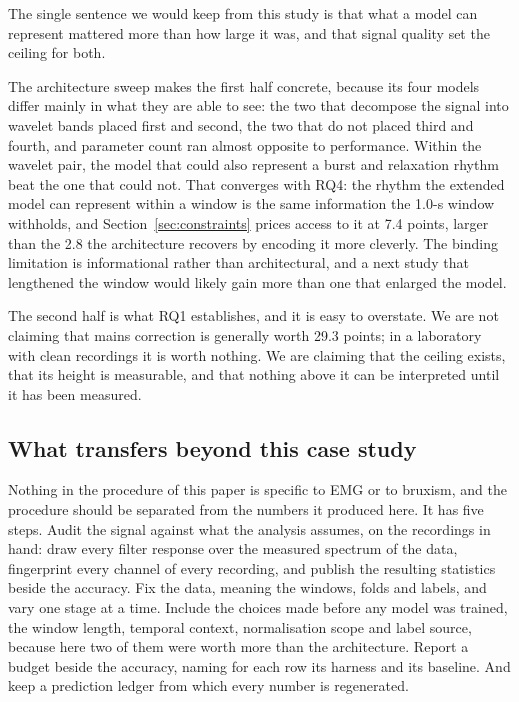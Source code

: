 \documentclass[pdflatex,sn-nature,iicol]{sn-jnl}
\begin{document}
The single sentence we would keep from this study is that what a model can represent mattered more than how large it was, and that signal quality set the ceiling for both.

The architecture sweep makes the first half concrete, because its four models differ mainly in what they are able to see: the two that decompose the signal into wavelet bands placed first and second, the two that do not placed third and fourth, and parameter count ran almost opposite to performance. Within the wavelet pair, the model that could also represent a burst and relaxation rhythm beat the one that could not. That converges with RQ4: the rhythm the extended model can represent within a window is the same information the 1.0-s window withholds, and Section~\ref{sec:constraints} prices access to it at 7.4 points, larger than the 2.8 the architecture recovers by encoding it more cleverly. The binding limitation is informational rather than architectural, and a next study that lengthened the window would likely gain more than one that enlarged the model.

The second half is what RQ1 establishes, and it is easy to overstate. We are not claiming that mains correction is generally worth 29.3 points; in a laboratory with clean recordings it is worth nothing. We are claiming that the ceiling exists, that its height is measurable, and that nothing above it can be interpreted until it has been measured.

\subsection{What transfers beyond this case study}
\label{sec:transfer}

Nothing in the procedure of this paper is specific to EMG or to bruxism, and the procedure should be separated from the numbers it produced here. It has five steps. Audit the signal against what the analysis assumes, on the recordings in hand: draw every filter response over the measured spectrum of the data, fingerprint every channel of every recording, and publish the resulting statistics beside the accuracy. Fix the data, meaning the windows, folds and labels, and vary one stage at a time. Include the choices made before any model was trained, the window length, temporal context, normalisation scope and label source, because here two of them were worth more than the architecture. Report a budget beside the accuracy, naming for each row its harness and its baseline. And keep a prediction ledger from which every number is regenerated.
\end{document}

